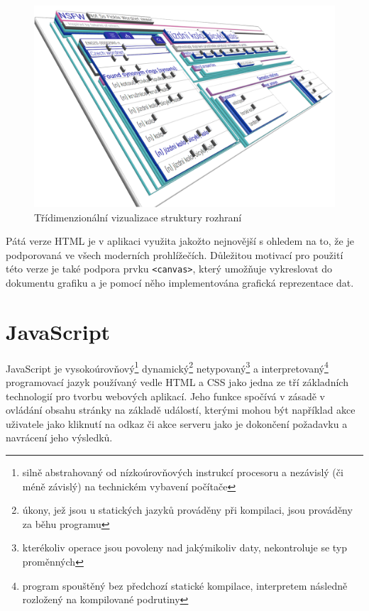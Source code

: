 \documentclass[a4paper, 11pt, oneside]{book}
\begin{document}
				\begin{figure}[h]
					\centering
					\includegraphics[width=1.0\textwidth]{html3d2.png}
					\caption{Třídimenzionální vizualizace struktury rozhraní}
					\label{fig:html3d}
				\end{figure}

				Pátá verze HTML je v aplikaci využita jakožto nejnovější s ohledem na to, že je podporovaná ve všech moderních prohlížečích. \parencite{html5support} Důležitou motivací pro použití této verze je také podpora prvku \texttt{<canvas>}, který umožňuje vykreslovat do dokumentu grafiku \parencite{w3schools2017htmlcanvas} a je pomocí něho implementována grafická reprezentace dat. 

			\section{JavaScript}

				JavaScript je vysokoúrovňový\footnote{silně abstrahovaný od nízkoúrovňových instrukcí procesoru a nezávislý (či méně závislý) na technickém vybavení počítače} dynamický\footnote{úkony, jež jsou u statických jazyků prováděny při kompilaci, jsou prováděny za běhu programu} netypovaný\footnote{kterékoliv operace jsou povoleny nad jakýmikoliv daty, nekontroluje se typ proměnných} a interpretovaný\footnote{program spouštěný bez předchozí statické kompilace, interpretem následně rozložený na kompilované podrutiny} programovací jazyk používaný vedle HTML a CSS jako jedna ze tří základních technologií pro tvorbu webových aplikací. Jeho funkce spočívá v zásadě v ovládání obsahu stránky na základě událostí, kterými mohou být například akce uživatele jako kliknutí na odkaz či akce serveru jako je dokončení požadavku a navrácení jeho výsledků.%
\end{document}

